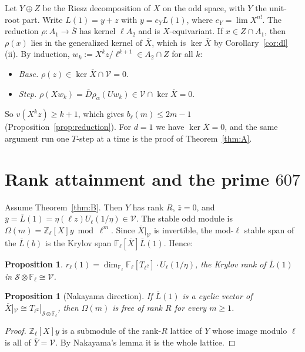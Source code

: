 \documentclass[11pt]{amsart}
\newcommand{\Zl}{\mathbb{Z}_\ell}
\newcommand{\Fl}{\mathbb{F}_\ell}
\newcommand{\Sb}{\overline{S}}
\newcommand{\Db}{\overline{D}}
\newcommand{\Xb}{\overline{X}}
\newcommand{\Lb}{\overline{L}}
\newcommand{\cS}{\mathcal{S}}
\newcommand{\cV}{\mathcal{V}}
\theoremstyle{plain}
\newtheorem{proposition}[theorem]{Proposition}
\theoremstyle{definition}
\numberwithin{equation}{section}
\begin{document}
Let $Y\oplus Z$ be the Riesz decomposition of $X$ on the odd space, with $Y$ the unit-root part. Write $L(1)=y+z$ with
$y=e_YL(1)$, where $e_Y=\lim X^{n!}$. The reduction $\rho:A_1\to\Sb$ has kernel $\ell A_2$ and is $X$-equivariant. If
$x\in Z\cap A_1$, then $\rho(x)$ lies in the generalized kernel of $\Xb$, which is $\ker\Xb$ by Corollary~\ref{cor:dl}(ii). By
induction, $w_k:=X^kz/\ell^{k+1}\in A_2\cap Z$ for all $k$:
\begin{itemize}
\item \emph{Base.} $\rho(z)\in\ker\Xb\cap\cV=0$.
\item \emph{Step.} $\rho(Xw_k)=\Db\rho_\alpha(Uw_k)\in\cV\cap\ker\Xb=0$.
\end{itemize}
So $v(X^kz)\ge k+1$, which gives $b_\ell(m)\le2m-1$ (Proposition~\ref{prop:reduction}). For $d=1$ we have $\ker\Xb=0$, and the
same argument run one $T$-step at a time is the proof of Theorem~\ref{thm:A}.

\section{Rank attainment and the prime $607$}\label{sec:rank}

Assume Theorem~\ref{thm:B}. Then $Y$ has rank $R$, $\bar z=0$, and $\bar y=\Lb(1)=\eta(\ell z)U_\ell(1/\eta)\in\cV$. The stable
odd module is $\Omega(m)=\Zl[X]y\bmod\ell^m$. Since $\Xb|_\cV$ is invertible, the mod-$\ell$ stable span of the $\Lb(b)$ is
the Krylov span $\Fl[\Xb]\Lb(1)$. Hence:

\begin{proposition}\label{prop:krylov}
$r_\ell(1)=\dim_{\Fl}\Fl[T_{\ell^2}]\cdot U_\ell(1/\eta)$, the Krylov rank of $\Lb(1)$ in $\cS\otimes\Fl\cong\cV$.
\end{proposition}

\begin{proposition}[Nakayama direction]\label{prop:nakayama}
If $\Lb(1)$ is a cyclic vector of $\Xb|_\cV\cong T_{\ell^2}|_{\cS\otimes\Fl}$, then $\Omega(m)$ is free of rank $R$ for every $m\ge1$.
\end{proposition}
\begin{proof}
$\Zl[X]y$ is a submodule of the rank-$R$ lattice of $Y$ whose image modulo $\ell$ is all of $\bar Y=\cV$. By Nakayama's lemma it is the
whole lattice.
\end{proof}
\end{document}
